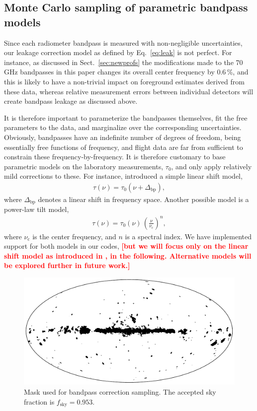 \documentclass[twocolumn]{aa}
\newcommand{\Dbp}[0]{\Delta_{\mathrm{bp}}}
\newcommand{\?}[1]{\textcolor{red}{{\bf [#1]}}}
\begin{document}
\subsection{Monte Carlo sampling of parametric bandpass models}
Since each radiometer bandpass is measured with
non-negligible uncertainties, our leakage correction model as defined
by Eq.~\eqref{eq:leak} is not perfect. For instance, as discussed in
Sect.~\ref{sec:newprofs} the modifications made to the 70\,GHz
bandpasses in this paper changes its overall center frequency by
0.6\,\%, and this is likely to have a non-trivial impact on foreground
estimates derived from these data, whereas relative measurement errors
between individual detectors will create bandpass leakage as discussed
above.

It is therefore important to parameterize the bandpasses themselves, fit the
free parameters to the data, and marginalize over the corresponding
uncertainties. Obviously, bandpasses have an indefinite number of degrees of
freedom, being essentially free functions of frequency, and flight data are far
from sufficient to constrain these frequency-by-frequency. It is therefore
customary to base parametric models on the laboratory measurements, $\tau_0$,
and only apply relatively mild corrections to these. For instance,
\citet{planck2014-a12} introduced a simple linear shift model,
\begin{align}
  \tau(\nu) = \tau_0(\nu+\Dbp),
  \label{eq:bpshift}
\end{align}
where $\Dbp$ denotes a linear shift in frequency space. Another
possible model is a power-law tilt model,
\begin{align}
  \tau(\nu) = \tau_0(\nu)\,\left(\frac{\nu}{\nu_\mathrm{c}}\right)^n,
  \label{eq:bpshift2}
\end{align}
where $\nu_{\mathrm{c}}$ is the center frequency, and $n$ is a spectral index.
We have implemented support for both models in our codes, \?{\textbf{but we will
focus only on the linear shift model as introduced in \citet{planck2014-a11}, in
the following. Alternative models will be explored further in future work.}}

\begin{figure}[t]
  \center
  \includegraphics[width=\linewidth]{figs/mask_proc_smap6_v1.pdf}
  \caption{Mask used for bandpass correction sampling. The accepted
    sky fraction is $f_{\mathrm{sky}}=0.953$.}
  \label{fig:procmask}
\end{figure}
\end{document}
